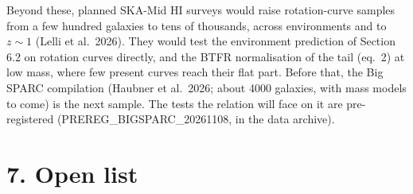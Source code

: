 \documentclass[
  10pt,
]{article}
\begin{document}
Beyond these, planned SKA-Mid HI surveys would raise rotation-curve samples from a few hundred galaxies to tens of thousands, across environments and to $z\sim1$ (Lelli et al.~2026). They would test the environment prediction of Section 6.2 on rotation curves directly, and the BTFR normalisation of the tail (eq.~2) at low mass, where few present curves reach their flat part. Before that, the Big SPARC compilation (Haubner et al.~2026; about 4000 galaxies, with mass models to come) is the next sample. The tests the relation will face on it are pre-registered (PREREG\_BIGSPARC\_20261108, in the data archive).



\section{7. Open list}\label{open-list}
\end{document}
